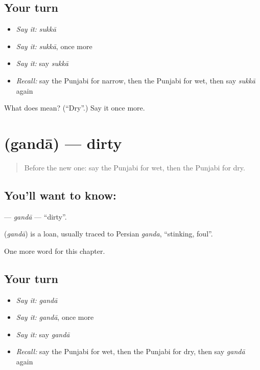 \subsection*{Your turn}
\begin{itemize}
\raggedright
  \item \emph{Say it:} \emph{sukkā}
  \item \emph{Say it:} \emph{sukkā}, once more
  \item \emph{Say it:} say \emph{sukkā}
  \item \emph{Recall:} say the Punjabi for narrow, then the Punjabi for wet, then say \emph{sukkā} again
\end{itemize}

\begin{tcolorbox}[breakable,colback=teal!4,colframe=teal!35!black,title={Before you move on}]
What does  mean? (\textquotedblleft{}Dry\textquotedblright{}.) Say it once more.
\end{tcolorbox}
\section[\texorpdfstring{\pa{ਗੰਦਾ} (gandā)}{ਗੰਦਾ (gandā)}]{ (gandā) — dirty}

\label{lesson:PA-C143-ganda}



\begin{quote}
Before the new one: say the Punjabi for wet, then the Punjabi for dry.
\end{quote}

\subsection*{You'll want to know: }
\textbf{} — \emph{gandā} — \textquotedblleft{}dirty\textquotedblright{}.

\begin{cousinweb}
\textbf{} (\emph{gandā}) is a loan, usually traced to Persian \emph{ganda}, \textquotedblleft{}stinking, foul\textquotedblright{}.
\end{cousinweb}

\begin{grammarlens}[title={What you've built}]
One more word for this chapter.
\end{grammarlens}

\subsection*{Your turn}
\begin{itemize}
\raggedright
  \item \emph{Say it:} \emph{gandā}
  \item \emph{Say it:} \emph{gandā}, once more
  \item \emph{Say it:} say \emph{gandā}
  \item \emph{Recall:} say the Punjabi for wet, then the Punjabi for dry, then say \emph{gandā} again
\end{itemize}

